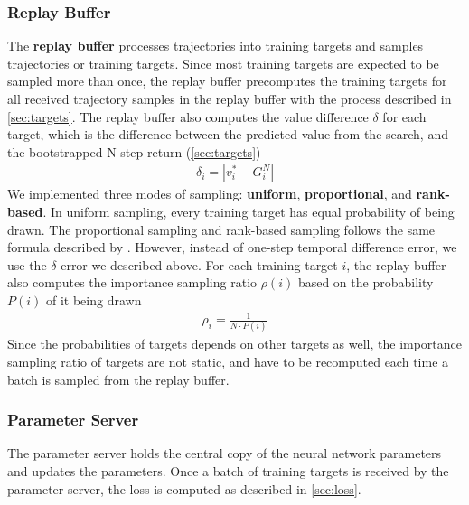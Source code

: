 \subsubsection{Replay Buffer} \label{sec:replay}
The \textbf{replay buffer} processes trajectories into training targets and samples trajectories or training targets.
Since most training targets are expected to be sampled more than once,
the replay buffer precomputes the training targets for all received trajectory samples in the replay buffer with the process described in \ref{sec:targets}.
The replay buffer also computes the value difference $\delta$ for each target,
which is the difference between the predicted value from the search, and the bootstrapped N-step return (\ref{sec:targets})
\begin{align*}
    \delta_i = | v^*_i - G^N_i |
\end{align*}
We implemented three modes of sampling: \textbf{uniform}, \textbf{proportional}, and \textbf{rank-based}.
In uniform sampling, every training target has equal probability of being drawn.
The proportional sampling and rank-based sampling follows the same formula described by \citeauthor{PrioritizedExperienceReplay_Schaul.Quan.ea_2016} \cite{PrioritizedExperienceReplay_Schaul.Quan.ea_2016}.
However, instead of one-step temporal difference error, we use the $\delta$ error we described above.
For each training target $i$, the replay buffer also computes the importance sampling ratio $\rho(i)$ based on the probability $P(i)$ of it being drawn
\begin{align*}
    \rho_{i}= \frac{1}{N \cdot P(i)}
\end{align*}
Since the probabilities of targets depends on other targets as well, the importance sampling ratio of targets are not static,
and have to be recomputed each time a batch is sampled from the replay buffer.

\subsubsection{Parameter Server} \label{sec:param_server}
The parameter server holds the central copy of the neural network parameters and updates the parameters.
Once a batch of training targets is received by the parameter server, the loss is computed as described in \ref{sec:loss}.


